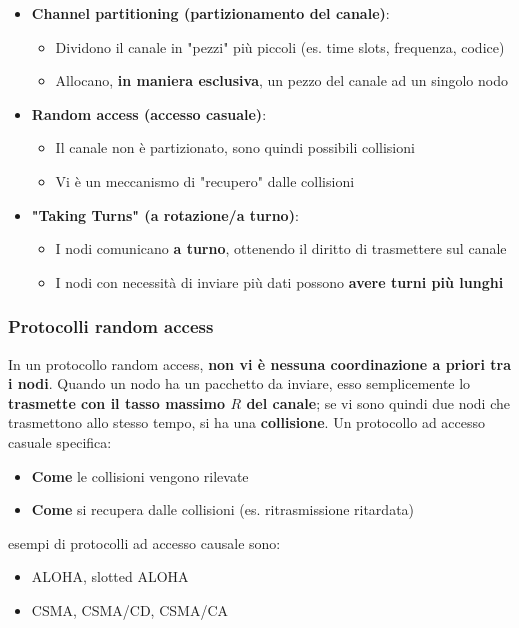 \documentclass[12pt]{article}
\begin{document}
\begin{itemize}
    \item \textbf{Channel partitioning (partizionamento del canale)}:
    \begin{itemize}
        \item Dividono il canale in "pezzi" più piccoli (es. time slots, frequenza, codice)
        \item Allocano, \textbf{in maniera esclusiva}, un pezzo del canale ad un singolo nodo
    \end{itemize}
    \item \textbf{Random access (accesso casuale)}:
    \begin{itemize}
        \item Il canale non è partizionato, sono quindi possibili collisioni
        \item Vi è un meccanismo di "recupero" dalle collisioni
    \end{itemize}
    \item \textbf{"Taking Turns" (a rotazione/a turno)}:
    \begin{itemize}
        \item I nodi comunicano \textbf{a turno}, ottenendo il diritto di trasmettere sul canale
        \item I nodi con necessità di inviare più dati possono \textbf{avere turni più lunghi}
    \end{itemize}
\end{itemize}
\subsubsection{Protocolli random access}
In un protocollo random access, \textbf{non vi è nessuna coordinazione a priori tra i nodi}.
Quando un nodo ha un pacchetto da inviare, esso semplicemente lo \textbf{trasmette con il tasso massimo $R$ del canale}; se vi sono quindi
due nodi che trasmettono allo stesso tempo, si ha una \textbf{collisione}.
Un protocollo ad accesso casuale specifica:
\begin{itemize}
    \item \textbf{Come} le collisioni vengono rilevate
    \item \textbf{Come} si recupera dalle collisioni (es. ritrasmissione ritardata)
\end{itemize}
esempi di protocolli ad accesso causale sono:
\begin{itemize}
    \item ALOHA, slotted ALOHA
    \item CSMA, CSMA/CD, CSMA/CA
\end{itemize}
\end{document}
